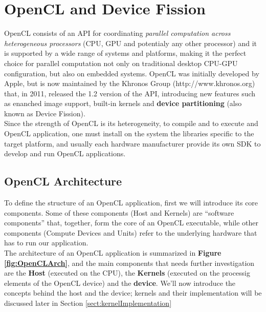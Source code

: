 
\section{OpenCL and Device Fission} \label{sect:openCL}

OpenCL consists of an API for coordinating \textit{parallel computation across heterogeneous processors} (CPU, GPU and potentialy any other processor) and it is supported by a wide range of systems and platforms, making it the perfect choice for parallel computation not only on traditional desktop CPU-GPU configuration, but also on embedded systems.
OpenCL was initially developed by Apple, but is now maintained by the Khronos Group (http://www.khronos.org) that, in 2011, released the 1.2 version of the API, introducing new features such as enanched image support, built-in kernels and \textbf{device partitioning} (also known as Device Fission).\\
Since the strength of OpenCL is its heterogeneity, to compile and to execute and OpenCL application, one must install on the system the libraries specific to the target platform, and usually each hardware manufacturer provide its own SDK to develop and run OpenCL applications.

\subsection{OpenCL Architecture} \label{sect:openCLArch}

To define the structure of an OpenCL application, first we will introduce its core components. Some of these components (Host and Kernels) are ``software components'' that, together, form the core of an OpenCL executable, while other components (Compute Devices and Units) refer to the underlying hardware that has to run our application.\\
The architecture of an OpenCL application is summarized in \textbf{Figure \ref{fig:OpenCLArch}}, and the main components that needs further investigation are the \textbf{Host} (executed on the CPU), the \textbf{Kernels} (executed on the processig elements of the OpenCL device) and the \textbf{device}. We'll now introduce the concepts behind the host and the device; kernels and their implementation will be discussed later in Section \ref{sect:kernelImplementation} \\

